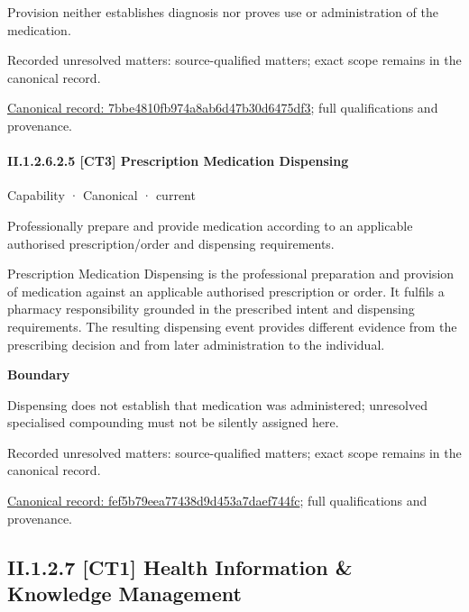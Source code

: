 Provision neither establishes diagnosis nor proves use or administration of the medication.


{\small Recorded unresolved matters: source-qualified matters; exact scope remains in the canonical record.}\par
{\footnotesize \href{../../../../continuum/strategy/capability/7bbe4810fb974a8ab6d47b30d6475df3.md}{Canonical record: 7bbe4810fb974a8ab6d47b30d6475df3}; full qualifications and provenance.}\par
\paragraph*{II.1.2.6.2.5 [CT3] Prescription Medication Dispensing}
\label{navigation:II.1.2.6.2.5}

\label{element:fef5b79eea77438d9d453a7daef744fc}
{\small Capability · Canonical · current}\par

Professionally prepare and provide medication according to an applicable authorised prescription/order and dispensing requirements.



Prescription Medication Dispensing is the professional preparation and provision of medication against an applicable authorised prescription or order. It fulfils a pharmacy responsibility grounded in the prescribed intent and dispensing requirements. The resulting dispensing event provides different evidence from the prescribing decision and from later administration to the individual.



\textbf{Boundary}



Dispensing does not establish that medication was administered; unresolved specialised compounding must not be silently assigned here.


{\small Recorded unresolved matters: source-qualified matters; exact scope remains in the canonical record.}\par
{\footnotesize \href{../../../../continuum/strategy/capability/fef5b79eea77438d9d453a7daef744fc.md}{Canonical record: fef5b79eea77438d9d453a7daef744fc}; full qualifications and provenance.}\par
\subsection*{II.1.2.7 [CT1] Health Information \& Knowledge Management}
\label{navigation:II.1.2.7}


